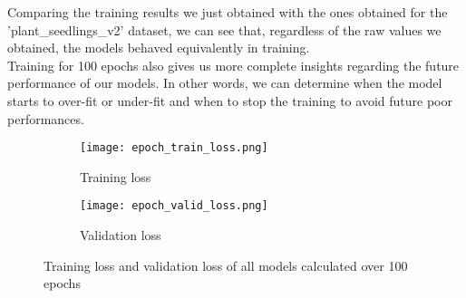 Comparing the training results we just obtained with the ones obtained for the 'plant\_seedlings\_v2' dataset, we can see that, regardless of the raw values we obtained, the models behaved equivalently in training. \\
Training for 100 epochs also gives us more complete insights regarding the future performance of our models. In other words, we can determine when the model starts to over-fit or under-fit and when to stop the training to avoid future poor performances. \\
\begin{figure}[h]
\begin{subfigure}{0.5\textwidth}
	    \texttt{[image: epoch\_train\_loss.png]}
	    \caption{Training loss}
        \label{fig:train_loss}
        
     \end{subfigure} \hfill
     \begin{subfigure}{0.5\textwidth}
	    \texttt{[image: epoch\_valid\_loss.png]}
	    \caption{Validation loss}
         \label{fig:valid_loss}
         
     \end{subfigure}
    
     
     \caption{ Training loss and validation loss of all models calculated over 100 epochs}
        \label{fig:tran_valid_loss}
\end{figure}


